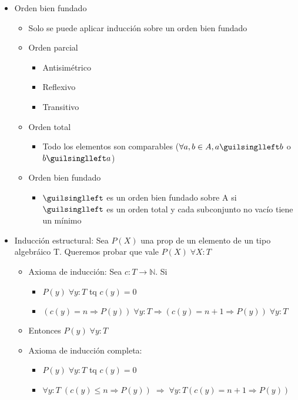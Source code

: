 \documentclass[a4paper,10pt]{article}
\begin{document}
    \begin{itemize}
	\item Orden bien fundado
	\begin{itemize}
	    \item Solo se puede aplicar inducción sobre un orden bien fundado
	    \item Orden parcial
	    \begin{itemize}
		\item Antisimétrico
		\item Reflexivo
		\item Transitivo
	    \end{itemize}
	    \item Orden total
	    \begin{itemize}
		\item Todo los elementos son comparables ($\forall a,b \in A, a \guilsinglleft b$ o $b \guilsinglleft a$)
	    \end{itemize}
	    \item Orden bien fundado
	    \begin{itemize}
		\item $\guilsinglleft$ es un orden bien fundado sobre A si $\guilsinglleft$ es un orden total y cada subconjunto no vacío tiene un mínimo
	    \end{itemize}
	\end{itemize}
	\item Inducción estructural: Sea $P(X)$ una prop de un elemento de un tipo algebráico T. Queremos probar que vale $P(X) \; \forall X:T$ 
	\begin{itemize}
	    \item Axioma de inducción: Sea $c:T \longrightarrow \mathbb{N}$. Si 
	    \begin{itemize}
		\item $P(y) \; \forall y:T$ tq $c(y)=0$
		\item $(c(y) = n \Rightarrow P(y)) \; \forall y:T \Rightarrow (c(y) = n+1 \Rightarrow P(y)) \; \forall y:T$
	    \end{itemize}
	    \item Entonces $P(y) \; \forall y:T$
	    \item Axioma de inducción completa:
	    \begin{itemize}
	   	\item $P(y) \; \forall y:T$ tq $c(y)=0$
		\item $\forall y:T \; (c(y) \leq n \Rightarrow P(y)) \; \Rightarrow \; \forall y:T (c(y)=n+1 \Rightarrow P(y))$
	    \end{itemize}

\end{itemize}
\end{itemize}
\end{document}
